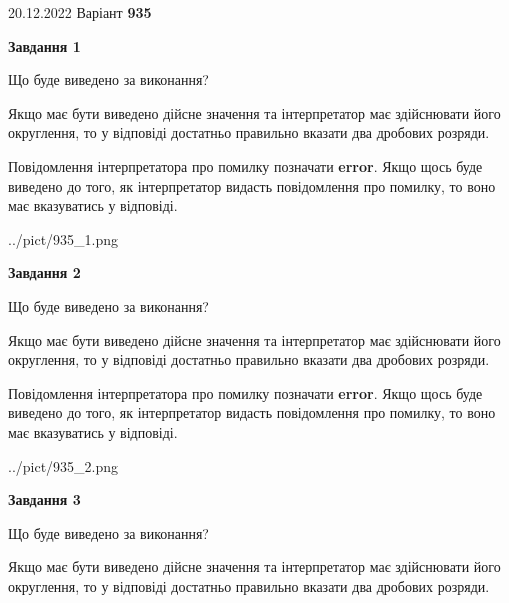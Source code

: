 \documentclass[12pt, ukrainian]{article}
\begin{document}
{20.12.2022 Варіант \No \textbf { 935 }\par}
{
\begin {Large}

{\begin {center}\textbf{Завдання 1}\end {center}}\par
Що буде виведено за виконання? \par

Якщо має бути виведено дійсне значення та інтерпретатор має здійснювати його округлення, 
то у відповіді достатньо правильно вказати два дробових розряди.

Повідомлення інтерпретатора про помилку позначати \textbf{error}.
Якщо щось буде виведено до того, як інтерпретатор видасть повідомлення про помилку, 
то воно має вказуватись у відповіді. \par

\begin{center}
	{../pict/935_1.png}
\end{center}
\newpage

{\begin {center}\textbf{Завдання 2}\end {center}}\par
Що буде виведено за виконання? \par

Якщо має бути виведено дійсне значення та інтерпретатор має здійснювати його округлення, 
то у відповіді достатньо правильно вказати два дробових розряди.

Повідомлення інтерпретатора про помилку позначати \textbf{error}.
Якщо щось буде виведено до того, як інтерпретатор видасть повідомлення про помилку, 
то воно має вказуватись у відповіді. \par

\begin{center}
	{../pict/935_2.png}
\end{center}
\newpage

{\begin {center}\textbf{Завдання 3}\end {center}}\par
Що буде виведено за виконання? \par

Якщо має бути виведено дійсне значення та інтерпретатор має здійснювати його округлення, 
то у відповіді достатньо правильно вказати два дробових розряди.


\end{Large}}
\end{document}
